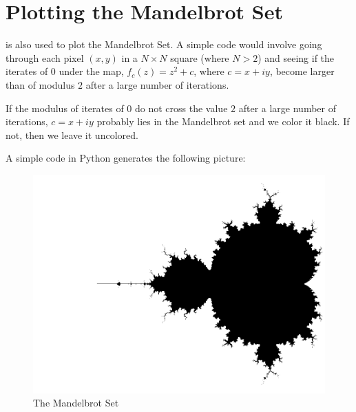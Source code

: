 \section{Plotting the Mandelbrot Set}
 is also used to plot the Mandelbrot Set. A simple code would involve going through each
pixel \( (x,y) \) in a \( N\times N \) square (where \( N>2 \)) and seeing if the iterates of \( 0 \)
under the map, \( f_c(z)=z^2+c \), where \( c=x+iy \),
become larger than of modulus \( 2 \) after a large number of iterations.

If the modulus of iterates of \( 0 \) do not cross the value \( 2 \) after a large number of iterations,
\( c=x+iy \) probably lies in the Mandelbrot set and we color it black. If not, then we leave it uncolored.

A simple code in Python generates the following picture:

\begin{figure}[htbp]
\includegraphics[scale=.35]{figures/mandelbrot.png}
\caption{The Mandelbrot Set}
\label{mandelbrot}
\end{figure}
